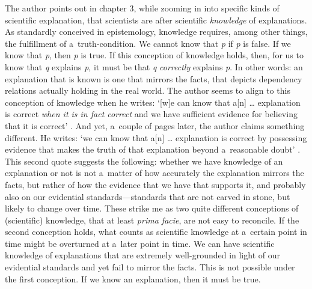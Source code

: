 The author points out in chapter 3, while zooming in into specific kinds of scientific explanation, that scientists are after scientific \textit{knowledge} of explanations. As standardly conceived in epistemology, knowledge requires, among other things, the fulfillment of a~truth-condition. We cannot know that \textit{p} if \textit{p} is false. If we know that \textit{p}, then \textit{p} is true. If this conception of knowledge holds, then, for us to know that \textit{q} explains \textit{p}, it must be that \textit{q} \textit{correctly} explains \textit{p}. In other words: an explanation that is known is one that mirrors the facts, that depicts dependency relations actually holding in the real world. The author seems to align to this conception of knowledge when he writes: ‘[w]e can know that a[n] … explanation is correct \textit{when it is in fact correct} and we have sufficient evidence for believing that it is correct'
\parencite[][emphasis added]{mccain_understanding_2022}. %
 And yet, a~couple of pages later, the author claims something different. He writes: ‘we can know that a[n] … explanation is correct by possessing evidence that makes the truth of that explanation beyond a~reasonable doubt' 
\parencite[][p.40]{mccain_understanding_2022}. %
 This second quote suggests the following: whether we have knowledge of an explanation or not is not a~matter of how accurately the explanation mirrors the facts, but rather of how the evidence that we have that supports it, and probably also on our evidential standards---standards that are not carved in stone, but likely to change over time. These strike me as two quite different conceptions of (scientific) knowledge, that at least \textit{prima facie}, are not easy to reconcile. If the second conception holds, what counts as scientific knowledge at a~certain point in time might be overturned at a~later point in time. We can have scientific knowledge of explanations that are extremely well-grounded in light of our evidential standards and yet fail to mirror the facts. This is not possible under the first conception. If we know an explanation, then it must be true.

